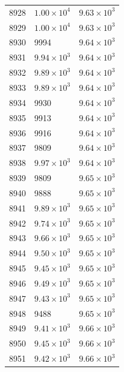 \begin{table}[H]
\begin{tabular}{lll}
8928 & $\displaystyle 1.00 \times 10^{4}$ & $\displaystyle 9.63 \times 10^{3}$ \\
8929 & $\displaystyle 1.00 \times 10^{4}$ & $\displaystyle 9.63 \times 10^{3}$ \\
8930 & 9994 & $\displaystyle 9.64 \times 10^{3}$ \\
8931 & $\displaystyle 9.94 \times 10^{3}$ & $\displaystyle 9.64 \times 10^{3}$ \\
8932 & $\displaystyle 9.89 \times 10^{3}$ & $\displaystyle 9.64 \times 10^{3}$ \\
8933 & $\displaystyle 9.89 \times 10^{3}$ & $\displaystyle 9.64 \times 10^{3}$ \\
8934 & 9930 & $\displaystyle 9.64 \times 10^{3}$ \\
8935 & 9913 & $\displaystyle 9.64 \times 10^{3}$ \\
8936 & 9916 & $\displaystyle 9.64 \times 10^{3}$ \\
8937 & 9809 & $\displaystyle 9.64 \times 10^{3}$ \\
8938 & $\displaystyle 9.97 \times 10^{3}$ & $\displaystyle 9.64 \times 10^{3}$ \\
8939 & 9809 & $\displaystyle 9.65 \times 10^{3}$ \\
8940 & 9888 & $\displaystyle 9.65 \times 10^{3}$ \\
8941 & $\displaystyle 9.89 \times 10^{3}$ & $\displaystyle 9.65 \times 10^{3}$ \\
8942 & $\displaystyle 9.74 \times 10^{3}$ & $\displaystyle 9.65 \times 10^{3}$ \\
8943 & $\displaystyle 9.66 \times 10^{3}$ & $\displaystyle 9.65 \times 10^{3}$ \\
8944 & $\displaystyle 9.50 \times 10^{3}$ & $\displaystyle 9.65 \times 10^{3}$ \\
8945 & $\displaystyle 9.45 \times 10^{3}$ & $\displaystyle 9.65 \times 10^{3}$ \\
8946 & $\displaystyle 9.49 \times 10^{3}$ & $\displaystyle 9.65 \times 10^{3}$ \\
8947 & $\displaystyle 9.43 \times 10^{3}$ & $\displaystyle 9.65 \times 10^{3}$ \\
8948 & 9488 & $\displaystyle 9.65 \times 10^{3}$ \\
8949 & $\displaystyle 9.41 \times 10^{3}$ & $\displaystyle 9.66 \times 10^{3}$ \\
8950 & $\displaystyle 9.45 \times 10^{3}$ & $\displaystyle 9.66 \times 10^{3}$ \\
8951 & $\displaystyle 9.42 \times 10^{3}$ & $\displaystyle 9.66 \times 10^{3}$ \\

\end{tabular}
\end{table}
